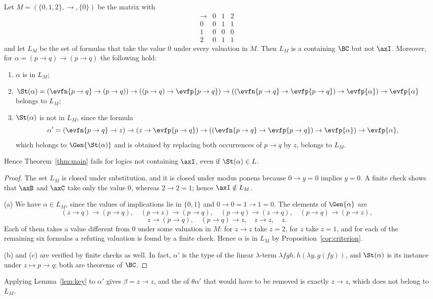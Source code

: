 \begin{proposition}\label{prop:needI}
Let $M=(\{0,1,2\},\to,\{0\})$ be the matrix with
\[
\begin{array}{c|ccc}
\to&0&1&2\\\hline
0&0&1&1\\
1&0&0&0\\
2&0&1&1
\end{array}
\]
and let $L_M$ be the set of formulas that take the value $0$ under every
valuation in $M$. Then $L_M$ is a  containing $\BC$ but not
$\axI$. Moreover, for $\alpha=(p\to q)\to(p\to q)$ the following hold:
\begin{enumerate}
\item[(a)] $\alpha$ is  in $L_M$;
\item[(b)] $\St(\alpha)=(\evfn{p\to q}\to(p\to q))\to((p\to q)\to \evfp{p\to q})
  \to((\evfn{p\to q}\to \evfp{p\to q})\to\evfp{\alpha})\to \evfp{\alpha}$
  belongs to $L_M$;
\item[(c)] $\St(\alpha)$ is not  in $L_M$, since the formula
  \[
  \alpha'=(\evfn{p\to q}\to z)\to(z\to \evfp{p\to q})\to((\evfn{p\to q}\to \evfp{p\to q})\to \evfp{\alpha})\to \evfp{\alpha} ,
  \]
  which belongs to $\Gen{\St(\alpha)}$ and is obtained by replacing both
  occurrences of $p\to q$ by $z$, belongs to $L_M$.
\end{enumerate}
Hence Theorem~\ref{thm:main} fails for logics not containing $\axI$, even if
$\St(\alpha)\in L$.
\end{proposition}
\begin{proof}
The set $L_M$ is closed under substitution, and it is closed under modus
ponens because $0\to y=0$ implies $y=0$. A finite check shows that $\axB$ and
$\axC$ take only the value $0$, whereas $2\to2=1$; hence $\axI\notin L_M$.

(a) We have $\alpha\in L_M$, since the values of implications lie in
$\{0,1\}$ and $0\to0=1\to1=0$. The elements of $\Gen{\alpha}$ are
\[
(z\to q)\to(p\to q),\quad (p\to z)\to(p\to q),\quad (p\to q)\to(z\to q),\quad
(p\to q)\to(p\to z),
\]
\[
z\to(p\to q),\quad (p\to q)\to z,\quad z\to z,\quad z .
\]
Each of them takes a value different from $0$ under some valuation in $M$:
for $z\to z$ take $z=2$, for $z$ take $z=1$, and for each of the remaining
six formulas a refuting valuation is found by a finite check. Hence
$\alpha$ is  in $L_M$ by Proposition~\ref{cor:criterion}.

(b) and (c) are verified by finite checks as well. In fact, $\alpha'$ is the
type of the linear $\lambda$-term $\lambda fgh.\,h(\lambda y.\,g(fy))$, and
$\St(\alpha)$ is its instance under $z\mapsto p\to q$; both are theorems of
$\BC$.
\end{proof}

Applying Lemma~\ref{lem:key} to $\alpha'$ gives $\beta=z\to z$, and the
 of $\theta\alpha'$ that would have to be removed is exactly
$z\to z$, which does not belong to $L_M$.
